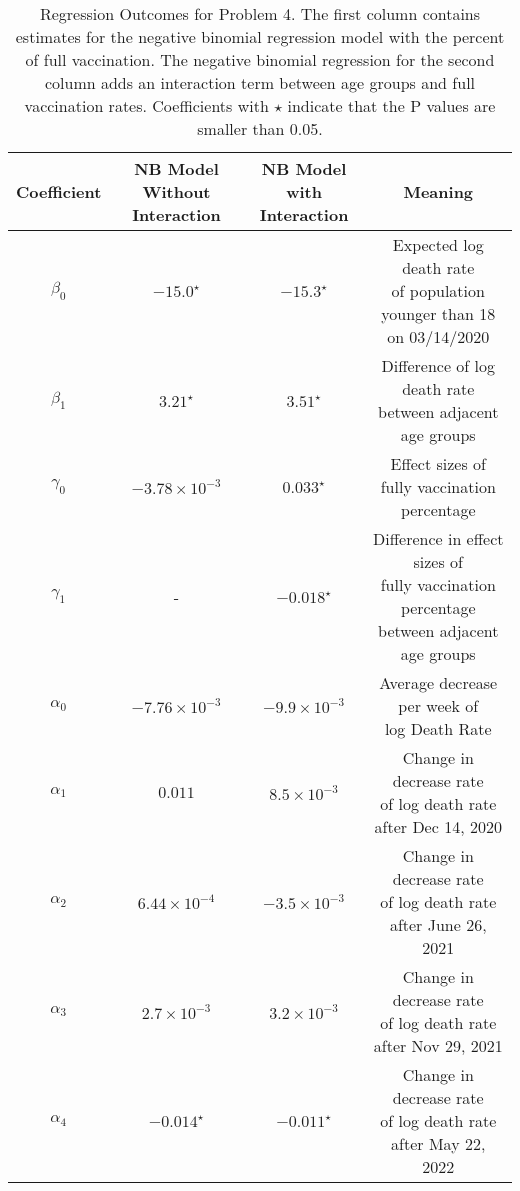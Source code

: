 \documentclass[12pt]{article}
\begin{document}
\begin{enumerate}[(a)]
	\begin{table}[htbp]
		\centering
		\begin{tabular}{cccc}
			\toprule
			Coefficient & \makecell{NB Model \\ Without Interaction} & \makecell{NB Model \\ with Interaction } &  Meaning\\
			\midrule
			$\beta_{0}$ & $-15.0^\star$ & $-15.3^\star$ & \makecell{Expected log death rate \\of population younger than 18\\ on 03/14/2020 }\\
			\addlinespace[0.2cm]
			$\beta_{1}$ & $3.21^\star$ & $3.51^\star$ &  \makecell{Difference of log death rate \\between adjacent age groups}\\
			\addlinespace[0.2cm]
			$\gamma_{0}$ & $-3.78\times 10^{-3}$ & $0.033^\star$ &  \makecell{Effect sizes of \\fully vaccination percentage}\\
			\addlinespace[0.2cm]
			$\gamma_{1}$ & - & $-0.018^\star$ &  \makecell{Difference in effect sizes of \\fully vaccination percentage \\ between adjacent age groups}\\
			\addlinespace[0.2cm] 
			$\alpha_{0}$ & $-7.76\times 10^{-3}$ & $-9.9\times 10^{-3}$ &   \makecell{Average decrease per week of \\ log Death Rate }\\
			\addlinespace[0.2cm]
			$\alpha_{1}$ & $0.011$ & $8.5\times 10^{-3}$ &  \makecell{Change in decrease rate \\ of log death rate\\ after Dec 14, 2020}\\
			\addlinespace[0.2cm]
			$\alpha_{2}$ & $6.44\times 10^{-4}$ & $-3.5\times 10^{-3}$ &  \makecell{Change in decrease rate \\ of log death rate\\ after June 26, 2021}\\
			\addlinespace[0.2cm]
			$\alpha_{3}$ & $2.7\times 10^{-3}$ & $3.2\times 10^{-3}$ & \makecell{Change in decrease rate \\ of log death rate\\ after Nov 29, 2021}\\
			\addlinespace[0.2cm]
			$\alpha_{4}$ & $-0.014^\star$ & $-0.011^\star$ &  \makecell{Change in decrease rate \\ of log death rate\\ after May 22, 2022}\\
			
			\bottomrule
		\end{tabular}
		\caption{Regression Outcomes for Problem 4. The first column contains estimates for the negative binomial regression model with the percent of full vaccination. The negative binomial regression for the second column adds an interaction term between age groups and full vaccination rates. Coefficients with $\star$ indicate that the P values are smaller than 0.05.}\label{P4table}
	\end{table}	
\end{enumerate}
\end{document}
